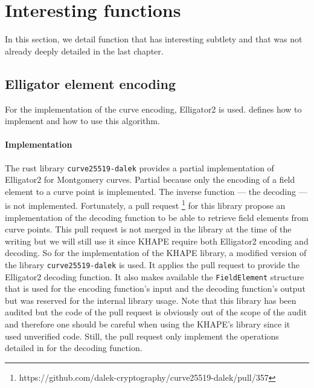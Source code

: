 ﻿\documentclass[../report.tex]{subfiles}
\begin{document}
\section{Interesting functions}
In this section, we detail function that has interesting subtlety and that was not already deeply detailed in the last chapter.
\subsection{Elligator element encoding} \label{sec:elligator2_implementation_function}
For the implementation of the curve encoding, Elligator2 is used.
\cite{Elligator2_Paper} defines how to implement and how to use this algorithm.
\paragraph{Implementation}
The rust library \verb|curve25519-dalek| provides a partial implementation of Elligator2 for Montgomery curves. Partial because only the encoding of a field element to a curve point is implemented. The inverse function --- the decoding --- is not implemented. 
Fortunately, a pull request \footnote{https://github.com/dalek-cryptography/curve25519-dalek/pull/357} for this library propose an implementation of the decoding function to be able to retrieve field elements from curve points. This pull request is not merged in the library at the time of the writing but we will still use it since KHAPE require both Elligator2 encoding and decoding. 
So for the implementation of the KHAPE library, a modified version of the library \verb|curve25519-dalek| is used. It applies the pull request to provide the Elligator2 decoding function.  It also makes available the \verb|FieldElement| structure that is used for the encoding function’s input and the decoding function's output but was reserved for the internal library usage. 
Note that this library has been audited \cite{Curve25519_Dalek_Audit} but the code of the pull request is obviously out of the scope of the audit and therefore one should be careful when using the KHAPE's library since it used unverified code. Still, the pull request only implement the operations detailed in \cite{Elligator2_Paper} for the decoding function.
\end{document}
